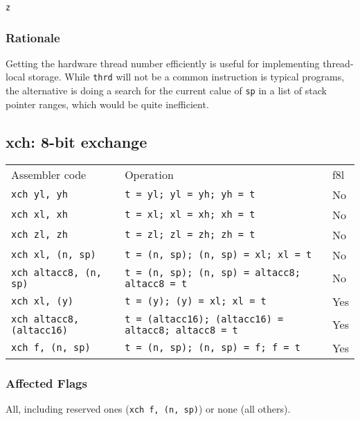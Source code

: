 \documentclass{book}
\begin{document}
\texttt{z}

\subsubsection*{Rationale}

Getting the hardware thread number efficiently is useful for implementing thread-local storage. While \texttt{thrd} will not be a common instruction is typical programs, the alternative is doing a search for the current calue of \texttt{sp} in a list of stack pointer ranges, which would be quite inefficient.


\subsection{xch: 8-bit exchange}

\begin{tabular}{l l l}
Assembler code                   & Operation                                                  & f8l \\
\texttt{xch yl, yh}              & \texttt{t = yl; yl = yh; yh = t}                           & No \\
\texttt{xch xl, xh}              & \texttt{t = xl; xl = xh; xh = t}                           & No \\
\texttt{xch zl, zh}              & \texttt{t = zl; zl = zh; zh = t}                           & No \\
\texttt{xch xl, (n, sp)}         & \texttt{t = (n, sp); (n, sp) = xl; xl = t}                 & No \\
\texttt{xch altacc8, (n, sp)}    & \texttt{t = (n, sp); (n, sp) = altacc8; altacc8 = t}       & No \\
\texttt{xch xl, (y)}             & \texttt{t = (y); (y) = xl; xl = t}                         & Yes \\
\texttt{xch altacc8, (altacc16)} & \texttt{t = (altacc16); (altacc16) = altacc8; altacc8 = t} & Yes \\
\texttt{xch f, (n, sp)}          & \texttt{t = (n, sp); (n, sp) = f; f = t}                   & Yes
\end{tabular}

\subsubsection*{Affected Flags}

All, including reserved ones (\texttt{xch f, (n, sp)}) or none (all others).
\end{document}
